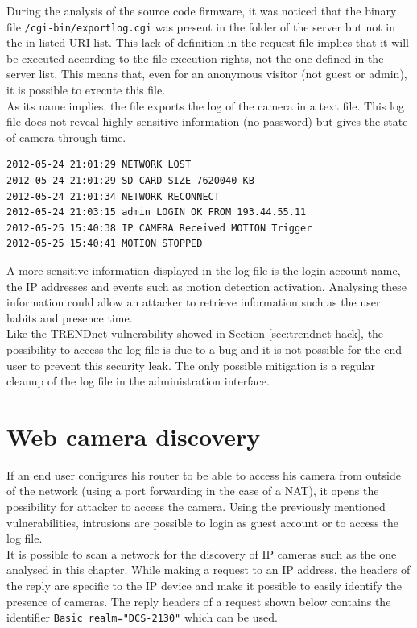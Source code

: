 During the analysis of the source code firmware, it was noticed that the binary file \texttt{/cgi-bin/exportlog.cgi} was present in the folder of the server but not in the in listed URI list.
This lack of definition in the request file implies that it will be executed according to the file execution rights, not the one defined in the server list.
This means that, even for an anonymous visitor (not guest or admin), it is possible to execute this file.\\

As its name implies, the file exports the log of the camera in a text file.
This log file does not reveal highly sensitive information (no password) but gives the state of camera through time.

\begin{verbatim}
2012-05-24 21:01:29 NETWORK LOST
2012-05-24 21:01:29 SD CARD SIZE 7620040 KB
2012-05-24 21:01:34 NETWORK RECONNECT
2012-05-24 21:03:15 admin LOGIN OK FROM 193.44.55.11
2012-05-25 15:40:38 IP CAMERA Received MOTION Trigger
2012-05-25 15:40:41 MOTION STOPPED
\end{verbatim}

A more sensitive information displayed in the log file is the login account name, the IP addresses and events such as motion detection activation.
Analysing these information could allow an attacker to retrieve information such as the user habits and presence time.\\

Like the TRENDnet vulnerability showed in Section \ref{sec:trendnet-hack}, the possibility to access the log file is due to a bug and it is not possible for the end user to prevent this security leak.
The only possible mitigation is a regular cleanup of the log file in the administration interface.

\section{Web camera discovery}
\label{sec:dcs-web-access}

If an end user configures his router to be able to access his camera from outside of the network (using a port forwarding in the case of a NAT), it opens the possibility for attacker to access the camera.
Using the previously mentioned vulnerabilities, intrusions are possible to login as guest account or to access the log file.\\

It is possible to scan a network for the discovery of IP cameras such as the one analysed in this chapter.
While making a request to an IP address, the headers of the reply are specific to the IP device and make it possible to easily identify the presence of cameras.
The reply headers of a request shown below contains the identifier \texttt{Basic realm="DCS-2130"} which can be used.

